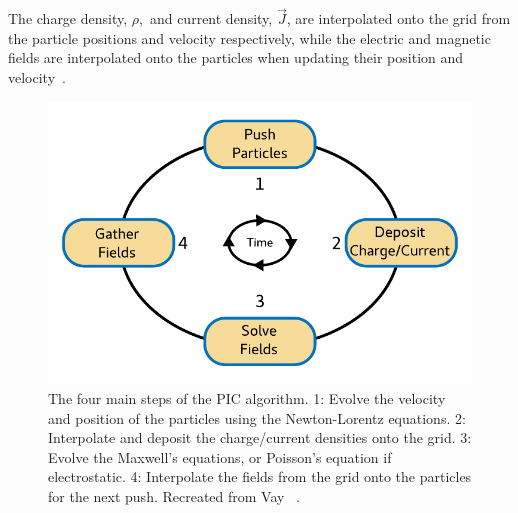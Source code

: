 The charge density, $\rho,$ and current density, $\vec{J}$, are interpolated onto the grid from the particle positions and velocity respectively, while the electric and magnetic fields are interpolated onto the particles when updating their position and velocity~\cite{vay:2016}.

\begin{figure}[hbt]
    \centering
    \includegraphics[width=0.7\linewidth]{figures/PIC-Diagram}
    \caption{\label{Fig:PIC}
        The four main steps of the PIC algorithm.
        1: Evolve the velocity and position of the particles using the Newton-Lorentz equations.
        2: Interpolate and deposit the charge/current densities onto the grid.
        3: Evolve the Maxwell's equations, or Poisson's equation if electrostatic.
        4: Interpolate the fields from the grid onto the particles for the next push.
        Recreated from Vay \etal~\cite{vay:2016}.
    }
\end{figure}

